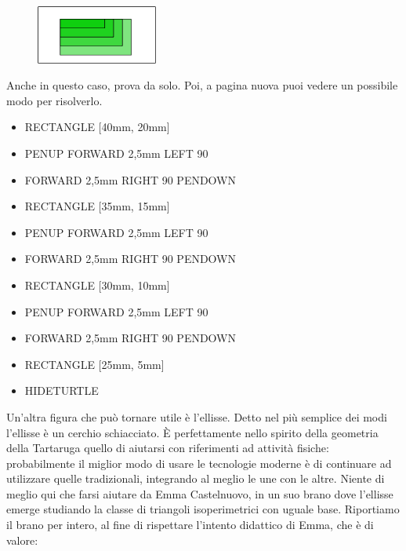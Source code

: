 \vskip 1cm

\begin{figure}[H]
   \centering
   \includegraphics[width=4.0cm,trim=4 4 8 4,clip]{./images/disegnare/disegnare-22.png}
   \label{dis-21}
\end{figure}

\vskip 1cm

Anche in questo caso, prova da solo. Poi, a pagina nuova puoi vedere un possibile modo per risolverlo.

\pagebreak

\vskip 1cm
\begin{scriptsize}
\begin{minipage}{1.0\textwidth}
\begin{itemize}[itemsep=-3pt,parsep=2pt]
\item[] RECTANGLE [40mm, 20mm]
\item[] PENUP FORWARD 2,5mm LEFT 90
\item[] FORWARD 2,5mm RIGHT 90 PENDOWN   
\item[] RECTANGLE [35mm, 15mm]
\item[] PENUP FORWARD 2,5mm LEFT 90
\item[] FORWARD 2,5mm RIGHT 90 PENDOWN
\item[] RECTANGLE [30mm, 10mm]
\item[] PENUP FORWARD 2,5mm LEFT 90      
\item[] FORWARD 2,5mm RIGHT 90 PENDOWN
\item[] RECTANGLE [25mm, 5mm]
\item[] HIDETURTLE                      
\end{itemize}
\end{minipage}
\end{scriptsize}

\vskip 1cm

Un'altra figura che può tornare utile è l'ellisse. Detto nel più semplice dei modi l'ellisse è un cerchio schiacciato. È perfettamente nello spirito della geometria della Tartaruga quello di aiutarsi con riferimenti ad attività fisiche: probabilmente il miglior modo di usare le tecnologie moderne è di continuare ad utilizzare quelle tradizionali, integrando al meglio le une con le altre. Niente di meglio qui che farsi aiutare da Emma Castelnuovo\cite{Castelnuovo}, in un suo brano dove l'ellisse emerge studiando la classe di triangoli isoperimetrici con uguale base. Riportiamo il brano per intero, al fine di rispettare l'intento didattico di Emma, che è di valore:

